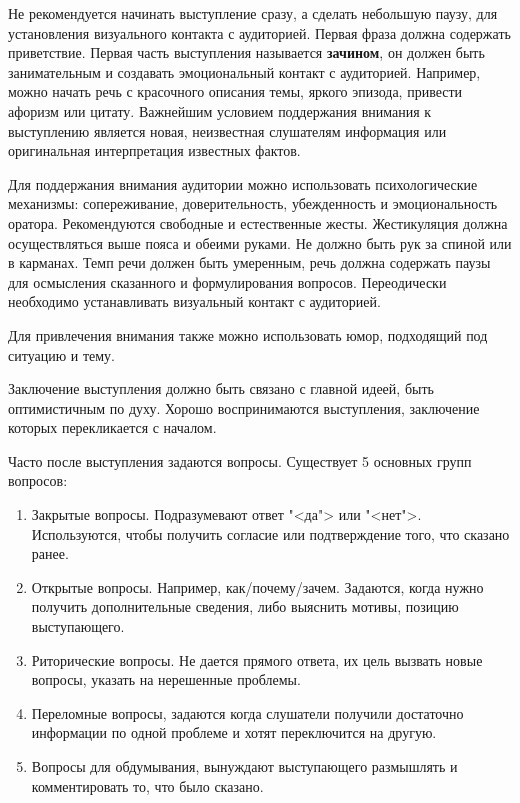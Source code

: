 Не рекомендуется начинать выступление сразу, а сделать небольшую паузу, для установления визуального контакта с аудиторией. Первая фраза должна содержать приветствие. Первая часть выступления называется \textbf{зачином}, он должен быть занимательным и создавать эмоциональный контакт с аудиторией. Например, можно начать речь с красочного описания темы, яркого эпизода, привести афоризм или цитату. Важнейшим условием поддержания внимания к выступлению является новая, неизвестная слушателям информация или оригинальная интерпретация известных фактов.

Для поддержания внимания аудитории можно использовать психологические механизмы: сопереживание, доверительность, убежденность и эмоциональность оратора. Рекомендуются свободные и естественные жесты. Жестикуляция должна осуществляться выше пояса и обеими руками. Не должно быть рук за спиной или в карманах. Темп речи должен быть умеренным, речь должна содержать паузы для осмысления сказанного и формулирования вопросов. Переодически необходимо устанавливать визуальный контакт с аудиторией.

Для привлечения внимания также можно использовать юмор, подходящий под ситуацию и тему.

Заключение выступления должно быть связано с главной идеей, быть оптимистичным по духу. Хорошо воспринимаются выступления, заключение которых перекликается с началом.

Часто после выступления задаются вопросы. Существует 5 основных групп вопросов:
\begin{enumerate}
	\item Закрытые вопросы. Подразумевают ответ "<да"> или "<нет">. Используются, чтобы получить согласие или подтверждение того, что сказано ранее.
	\item Открытые вопросы. Например, как/почему/зачем. Задаются, когда нужно получить дополнительные сведения, либо выяснить мотивы, позицию выступающего.
	\item Риторические вопросы. Не дается прямого ответа, их цель вызвать новые вопросы, указать на нерешенные проблемы.
	\item Переломные вопросы, задаются когда слушатели получили достаточно информации по одной проблеме и хотят переключится на другую.
	\item Вопросы для обдумывания, вынуждают выступающего размышлять и комментировать то, что было сказано.
\end{enumerate}

